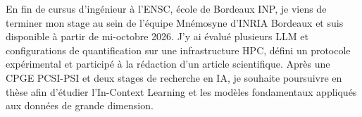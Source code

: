 
\begin{cvparagraph}
En fin de cursus d’ingénieur à l’ENSC, école de Bordeaux INP, je viens de terminer mon stage au sein de l’équipe Mnémosyne d’INRIA Bordeaux et suis disponible à partir de mi-octobre 2026. J’y ai évalué plusieurs LLM et configurations de quantification sur une infrastructure HPC, défini un protocole expérimental et participé à la rédaction d’un article scientifique. Après une CPGE PCSI-PSI et deux stages de recherche en IA, je souhaite poursuivre en thèse afin d’étudier l’In-Context Learning et les modèles fondamentaux appliqués aux données de grande dimension.
\end{cvparagraph}
